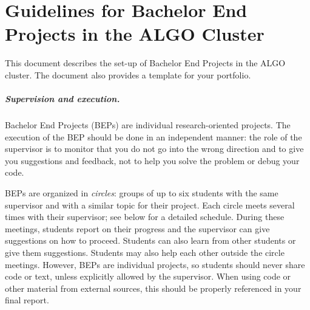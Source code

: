 \documentclass[report,english,cleveref,autoref,a4paper]{lipics-v2021}
\newif\ifGuidelines
\begin{document}

\ifGuidelines
\section*{Guidelines for Bachelor End Projects in the ALGO Cluster}
\thispagestyle{empty}
This document describes the set-up of Bachelor End Projects in the ALGO cluster.
The document also provides a template for your portfolio.


\subparagraph{Supervision and execution.}
Bachelor End Projects (BEPs) are individual research-oriented projects.
The execution of the BEP should be done in an independent manner: the role of the
supervisor is to monitor that you do not go into the wrong direction and to give
you suggestions and feedback, not to help you solve the problem or debug your code. 

BEPs are organized in \emph{circles}: groups of up to six students with the
same supervisor and with a similar topic for their project. Each circle meets
several times with their supervisor; see below for a detailed schedule. 
During these meetings, students report on their progress and the
supervisor can give suggestions on how to proceed. Students can also learn
from other students or give them suggestions. Students may also help each other 
outside the circle meetings. However, BEPs are individual projects, so students should 
never share code or text, unless explicitly allowed by the supervisor.
When using code or other material from external sources, this should
be properly referenced in your final report.
\end{document}
